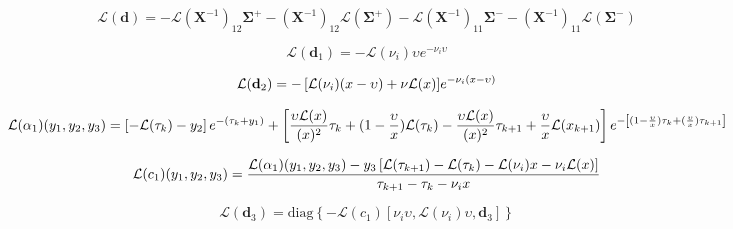 \begin{equation}
\mathcal{L}(\mathbf{d}) = -\mathcal{L}(\mathbf{X}^{-1})_{12}\mathbf{\Sigma}^{+} - (\mathbf{X}^{-1})_{12}\mathcal{L}(\mathbf{\Sigma}^{+}) - \mathcal{L}(\mathbf{X}^{-1})_{11}\mathbf{\Sigma}^{-} - (\mathbf{X}^{-1})_{11}\mathcal{L}(\mathbf{\Sigma}^{-})
\label{eq:mem-radiance_at_optical_depth-tangent_linear-d_l}
\end{equation}

\begin{equation}
\mathcal{L}(\mathbf{d}_{1}) = -\mathcal{L}(\nu_{i})\upsilon e^{-\nu_{i} \upsilon}
\label{eq:mem-radiance_at_optical_depth-tangent_linear-d1_l}
\end{equation}

\begin{equation}
\mathcal{L}(\mathbf{d}_{2}) = -\left[\mathcal{L}(\nu_{i})(x - \upsilon) + \nu\mathcal{L}(x\right)] e^{-\nu_{i} (x - \upsilon)}
\label{eq:mem-radiance_at_optical_depth-tangent_linear-d2_l}
\end{equation}

\begin{adjustwidth}{-1.25in}{-1.25in}
\center
\begin{equation}
\mathcal{L}(\alpha_{1})(y_{1}, y_{2}, y_{3}) = \left[-\mathcal{L}(\tau_{k}) - y_{2}\right] e^{-(\tau_{k} + y_{1})} + \left[\frac{\upsilon \mathcal{L}(x)}{(x)^{2}}\tau_{k} + (1 - \frac{\upsilon}{x})\mathcal{L}(\tau_{k}) - \frac{\upsilon \mathcal{L}(x)}{(x)^{2}}\tau_{k+1} + \frac{\upsilon}{x}\mathcal{L}(x_{k+1})\right] e^{-\left[(1 - \frac{\upsilon}{x})\tau_{k} + (\frac{\upsilon}{x})\tau_{k+1}\right]}
\label{eq:mem-radiance_at_optical_depth-tangent_linear-alpha1_l}
\end{equation}
\end{adjustwidth}

\begin{equation}
\mathcal{L}(c_{1})(y_{1}, y_{2}, y_{3}) = \frac{\mathcal{L}(\alpha_{1})(y_{1}, y_{2}, y_{3}) - y_{3}\left[\mathcal{L}(\tau_{k+1}) - \mathcal{L}(\tau_{k}) - \mathcal{L}(\nu_{i})x - \nu_{i}\mathcal{L}(x)\right]}{\tau_{k+1} - \tau_{k} - \nu_{i}x}
\label{eq:mem-radiance_at_optical_depth-tangent_linear-c1_l}
\end{equation}

\begin{equation}
\mathcal{L}(\mathbf{d}_{3}) = \mathrm{diag}\left\{-\mathcal{L}(c_{1})\left[\nu_{i}\upsilon, \mathcal{L}(\nu_{i})\upsilon, \mathbf{d}_{3}\right]\right\}
\label{eq:mem-radiance_at_optical_depth-tangent_linear-d4_l}
\end{equation}

